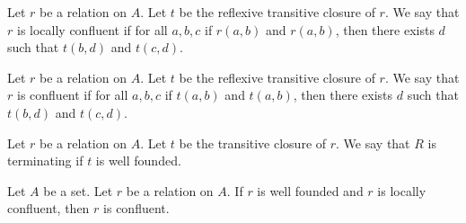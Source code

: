 \begin{definition}
   Let $r$ be a relation on $A$.
   Let $t$ be the reflexive transitive closure of $r$.
   We say that $r$ is locally confluent if
   for all $a, b, c$ if $r(a, b)$ and $r(a, b)$,
   then there exists $d$ such that
   $t(b, d)$ and $t(c, d)$.
\end{definition}


\begin{definition}
   Let $r$ be a relation on $A$.
   Let $t$ be the reflexive transitive closure of $r$.
   We say that $r$ is confluent if
   for all $a, b, c$ if $t(a, b)$ and $t(a, b)$,
   then there exists $d$ such that
   $t(b, d)$ and $t(c, d)$.
\end{definition}


\begin{definition}
   Let $r$ be a relation on $A$.
   Let $t$ be the transitive closure of $r$.
   We say that $R$ is terminating if $t$ is well founded.
\end{definition}


\begin{theorem}
   Let $A$ be a set.
   Let $r$ be a relation on $A$.
   If $r$ is well founded and $r$ is locally confluent,
   then $r$ is confluent.
\end{theorem}
